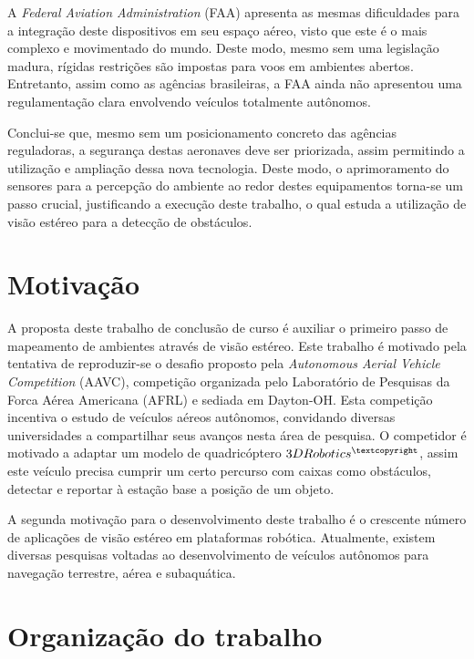 A \textit{Federal Aviation Administration} (FAA) apresenta as mesmas dificuldades para a integração deste dispositivos em seu espaço aéreo, visto que este é o mais complexo e movimentado do mundo. Deste modo, mesmo sem uma legislação madura, rígidas restrições são impostas para voos em ambientes abertos. Entretanto, assim como as agências brasileiras, a FAA ainda não apresentou uma regulamentação clara envolvendo veículos totalmente autônomos. 

Conclui-se que, mesmo sem um posicionamento concreto das agências reguladoras, a segurança destas aeronaves deve ser priorizada, assim permitindo a utilização e ampliação dessa nova tecnologia. Deste modo, o aprimoramento do sensores para a percepção do ambiente ao redor destes equipamentos torna-se um passo crucial, justificando a execução deste trabalho, o qual estuda a utilização de visão estéreo para a detecção de obstáculos.


\section{Motivação}

A proposta deste trabalho de conclusão de curso é auxiliar o primeiro passo de mapeamento de ambientes através de visão estéreo. Este trabalho é motivado pela tentativa de reproduzir-se o desafio proposto pela \textit{Autonomous Aerial Vehicle Competition} (AAVC)\cite{AAVC}, competição organizada pelo Laboratório de Pesquisas da Forca Aérea Americana (AFRL) e sediada em Dayton-OH. Esta competição incentiva o estudo de veículos aéreos autônomos, convidando diversas universidades a compartilhar seus avanços nesta área de pesquisa. O competidor é motivado a adaptar um modelo de quadricóptero $3DRobotics^{\textcopyright}$, assim este veículo precisa cumprir um certo percurso com caixas como obstáculos, detectar e reportar à estação base a posição de um objeto.

A segunda motivação para o desenvolvimento deste trabalho é o crescente número de aplicações de visão estéreo em plataformas robótica. Atualmente, existem diversas pesquisas voltadas ao desenvolvimento de veículos autônomos para navegação terrestre, aérea e subaquática.


\section{Organização do trabalho}

